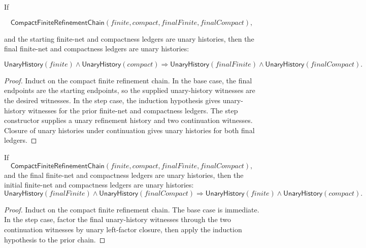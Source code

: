 \begin{theorem}
\label{thm:compact-finite-refinement-chain-final-endpoints-unary}
If

$$
\mathsf{CompactFiniteRefinementChain}(finite,compact,finalFinite,finalCompact),
$$

and the starting finite-net and compactness ledgers are unary histories, then
the final finite-net and compactness ledgers are unary histories:

$$
\mathsf{UnaryHistory}(finite)\land\mathsf{UnaryHistory}(compact)
\Longrightarrow
\mathsf{UnaryHistory}(finalFinite)\land
\mathsf{UnaryHistory}(finalCompact).
$$
\end{theorem}
\begin{proof}
Induct on the compact finite refinement chain. In the base case, the final
endpoints are the starting endpoints, so the supplied unary-history witnesses
are the desired witnesses. In the step case, the induction hypothesis gives
unary-history witnesses for the prior finite-net and compactness ledgers. The
step constructor supplies a unary refinement history and two continuation
witnesses. Closure of unary histories under continuation gives unary histories
for both final ledgers.
\end{proof}

\begin{theorem}
\label{thm:compact-finite-refinement-chain-initial-endpoints-unary}
If
$$
\mathsf{CompactFiniteRefinementChain}(finite,compact,finalFinite,finalCompact),
$$
and the final finite-net and compactness ledgers are unary histories, then the
initial finite-net and compactness ledgers are unary histories:
$$
\mathsf{UnaryHistory}(finalFinite)\land\mathsf{UnaryHistory}(finalCompact)
\Longrightarrow
\mathsf{UnaryHistory}(finite)\land\mathsf{UnaryHistory}(compact).
$$
\end{theorem}
\begin{proof}
Induct on the compact finite refinement chain. The base case is immediate. In
the step case, factor the final unary-history witnesses through the two
continuation witnesses by unary left-factor closure, then apply the induction
hypothesis to the prior chain.
\end{proof}

